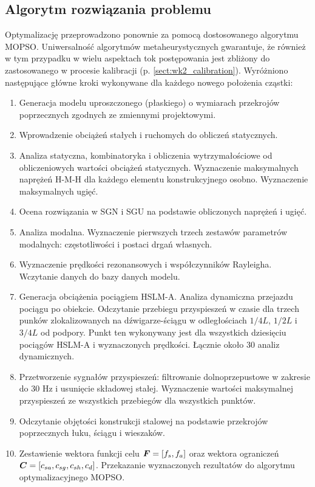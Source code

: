\subsection{Algorytm rozwiązania problemu}
Optymalizację przeprowadzono ponownie za pomocą dostosowanego algorytmu MOPSO. Uniwersalność algorytmów metaheurystycznych gwarantuje, że również w tym przypadku w wielu aspektach tok postępowania jest zbliżony do zastosowanego w procesie kalibracji (p. \ref{sect:wk2_calibration}). Wyróżniono następujące główne kroki wykonywane dla każdego nowego położenia cząstki:
\begin{enumerate}
	\item Generacja modelu uproszczonego (płaskiego) o wymiarach przekrojów poprzecznych zgodnych ze zmiennymi projektowymi.
	\item Wprowadzenie obciążeń stałych i ruchomych do obliczeń statycznych.
	\item Analiza statyczna, kombinatoryka i obliczenia wytrzymałościowe od obliczeniowych wartości obciążeń statycznych. Wyznaczenie maksymalnych naprężeń H-M-H dla każdego elementu konstrukcyjnego osobno. Wyznaczenie maksymalnych ugięć.
	\item Ocena rozwiązania w SGN i SGU na podstawie obliczonych naprężeń i ugięć.
	\item Analiza modalna. Wyznaczenie pierwszych trzech zestawów parametrów modalnych: częstotliwości i postaci drgań własnych.
	\item Wyznaczenie prędkości rezonansowych i współczynników Rayleigha. Wczytanie danych do bazy danych modelu.
	\item Generacja obciążenia pociągiem HSLM-A. Analiza dynamiczna przejazdu pociągu po obiekcie. Odczytanie przebiegu przyspieszeń w czasie dla trzech punków zlokalizowanych na dźwigarze-ściągu w odległościach $1/4L$, $1/2L$ i $3/4L$ od podpory. Punkt ten wykonywany jest dla wszystkich dziesięciu pociągów HSLM-A i wyznaczonych prędkości. Łącznie około 30 analiz dynamicznych.
	\item Przetworzenie sygnałów przyspieszeń: filtrowanie dolnoprzepustowe w zakresie do 30 Hz i usunięcie składowej stałej. Wyznaczenie wartości maksymalnej przyspieszeń ze wszystkich przebiegów dla wszystkich punktów.
	\item Odczytanie objętości konstrukcji stalowej na podstawie przekrojów poprzecznych łuku, ściągu i wieszaków.
	\item Zestawienie wektora funkcji celu $\bm{F}=[f_s,f_a]$ oraz wektora ograniczeń $\bm{C}=[c_{sa}, c_{sg}, c_{sh}, c_d]$. Przekazanie wyznaczonych rezultatów do algorytmu optymalizacyjnego MOPSO.
\end{enumerate}

